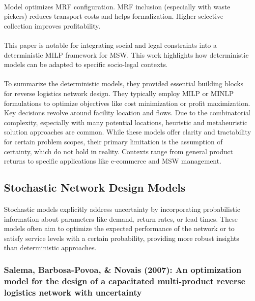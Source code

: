 \paragraph{} Model optimizes MRF configuration. MRF inclusion (especially with waste pickers) reduces transport costs and helps formalization. Higher selective collection improves profitability.

\paragraph{} This paper is notable for integrating social and legal constraints into a deterministic MILP framework for MSW. This work highlights how deterministic models can be adapted to specific socio-legal contexts.

\paragraph{} To summarize the deterministic models, they provided essential building blocks for reverse logistics network design. They typically employ MILP or MINLP formulations to optimize objectives like cost minimization or profit maximization. Key decisions revolve around facility location and flows. Due to the combinatorial complexity, especially with many potential locations, heuristic and metaheuristic solution approaches are common. While these models offer clarity and tractability for certain problem scopes, their primary limitation is the assumption of certainty, which do not hold in reality. Contexts range from general product returns to specific applications like e-commerce and MSW management.

\subsection{Stochastic Network Design Models}

\paragraph{} Stochastic models explicitly address uncertainty by incorporating probabilistic information about parameters like demand, return rates, or lead times. These models often aim to optimize the expected performance of the network or to satisfy service levels with a certain probability, providing more robust insights than deterministic approaches.

\subsubsection{Salema, Barbosa-Povoa, \& Novais (2007): An optimization model for the design of a capacitated multi-product reverse logistics network with uncertainty}
